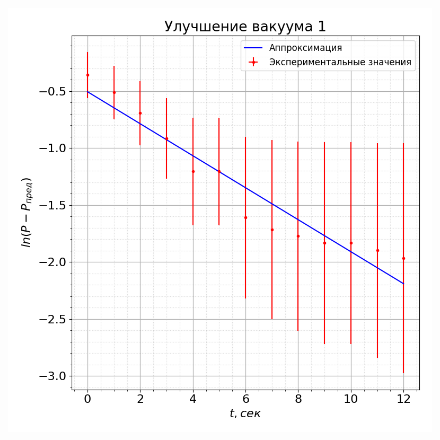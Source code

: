 \documentclass[a4paper, 12pt]{article}
\begin{document}
\begin{figure}[ht]
\begin{minipage}{0.45\textwidth}
                    \includegraphics[width=1\linewidth]{graphs/fall1.png}
                    \label{fall1}
                \end{minipage}
            \end{figure}
\end{document}
